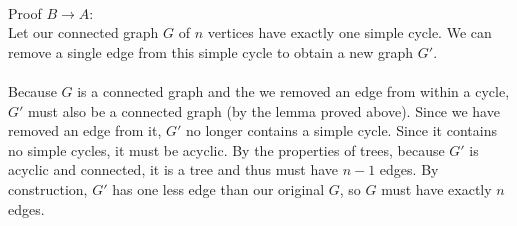 \documentclass[a4paper]{article}
\begin{document}
\begin{enumerate}
\\
Proof $B\to A$: \\
Let our connected graph $G$ of $n$ vertices have exactly one simple cycle. We can remove a single edge from this simple cycle to obtain a new graph $G'$. \\
\\
Because $G$ is a connected graph and the we removed an edge from within a cycle, $G'$ must also be a connected graph (by the lemma proved above). Since we have removed an edge from it, $G'$ no longer contains a simple cycle. Since it contains no simple cycles, it must be acyclic. By the properties of trees, because $G'$ is acyclic and connected, it is a tree and thus must have $n-1$ edges. By construction, $G'$ has one less edge than our original $G$, so $G$ must have exactly $n$ edges.



\end{enumerate}
\end{document}
